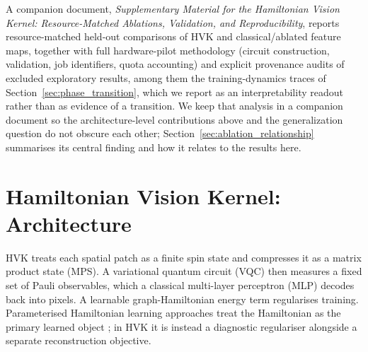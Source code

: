 \documentclass[pdflatex,sn-basic]{sn-jnl}
\begin{document}
A companion document, \textit{Supplementary Material for the Hamiltonian Vision
Kernel: Resource-Matched Ablations, Validation, and Reproducibility}, reports
resource-matched held-out comparisons of HVK and classical/ablated feature maps,
together with full hardware-pilot methodology (circuit construction, validation,
job identifiers, quota accounting) and explicit provenance audits of excluded
exploratory results, among them the training-dynamics traces of
Section~\ref{sec:phase_transition}, which we report as an interpretability
readout rather than as evidence of a transition. We keep that analysis in a
companion document so the architecture-level contributions above and the
generalization question do not obscure each other;
Section~\ref{sec:ablation_relationship} summarises its central finding and how it
relates to the results here.

\section{Hamiltonian Vision Kernel: Architecture}
\label{sec:architecture}

\color{blue}
HVK treats each spatial patch as a finite spin state and compresses it as a
matrix product state (MPS). A variational quantum circuit (VQC) then measures a
fixed set of Pauli observables, which a classical multi-layer perceptron (MLP)
decodes back into pixels. A learnable graph-Hamiltonian energy term regularises
training. Parameterised Hamiltonian learning approaches treat the Hamiltonian as
the primary learned object \citep{Shi2022}; in HVK it is instead a diagnostic
regulariser alongside a separate reconstruction objective.
\end{document}
